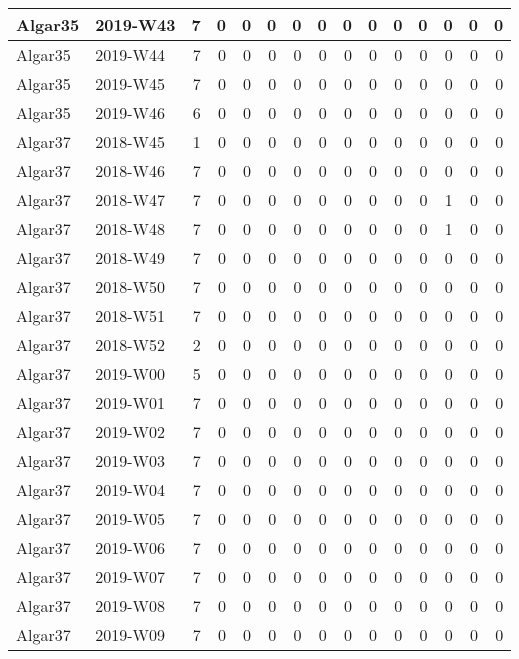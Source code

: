 \documentclass[]{book}
\begin{document}
\begin{table}
\begin{tabular}[t]{l|l|r|r|r|r|r|r|r|r|r|r|r|r|r}
\hline
Algar35 & 2019-W43 & 7 & 0 & 0 & 0 & 0 & 0 & 0 & 0 & 0 & 0 & 0 & 0 & 0\\
\hline
Algar35 & 2019-W44 & 7 & 0 & 0 & 0 & 0 & 0 & 0 & 0 & 0 & 0 & 0 & 0 & 0\\
\hline
Algar35 & 2019-W45 & 7 & 0 & 0 & 0 & 0 & 0 & 0 & 0 & 0 & 0 & 0 & 0 & 0\\
\hline
Algar35 & 2019-W46 & 6 & 0 & 0 & 0 & 0 & 0 & 0 & 0 & 0 & 0 & 0 & 0 & 0\\
\hline
Algar37 & 2018-W45 & 1 & 0 & 0 & 0 & 0 & 0 & 0 & 0 & 0 & 0 & 0 & 0 & 0\\
\hline
Algar37 & 2018-W46 & 7 & 0 & 0 & 0 & 0 & 0 & 0 & 0 & 0 & 0 & 0 & 0 & 0\\
\hline
Algar37 & 2018-W47 & 7 & 0 & 0 & 0 & 0 & 0 & 0 & 0 & 0 & 0 & 1 & 0 & 0\\
\hline
Algar37 & 2018-W48 & 7 & 0 & 0 & 0 & 0 & 0 & 0 & 0 & 0 & 0 & 1 & 0 & 0\\
\hline
Algar37 & 2018-W49 & 7 & 0 & 0 & 0 & 0 & 0 & 0 & 0 & 0 & 0 & 0 & 0 & 0\\
\hline
Algar37 & 2018-W50 & 7 & 0 & 0 & 0 & 0 & 0 & 0 & 0 & 0 & 0 & 0 & 0 & 0\\
\hline
Algar37 & 2018-W51 & 7 & 0 & 0 & 0 & 0 & 0 & 0 & 0 & 0 & 0 & 0 & 0 & 0\\
\hline
Algar37 & 2018-W52 & 2 & 0 & 0 & 0 & 0 & 0 & 0 & 0 & 0 & 0 & 0 & 0 & 0\\
\hline
Algar37 & 2019-W00 & 5 & 0 & 0 & 0 & 0 & 0 & 0 & 0 & 0 & 0 & 0 & 0 & 0\\
\hline
Algar37 & 2019-W01 & 7 & 0 & 0 & 0 & 0 & 0 & 0 & 0 & 0 & 0 & 0 & 0 & 0\\
\hline
Algar37 & 2019-W02 & 7 & 0 & 0 & 0 & 0 & 0 & 0 & 0 & 0 & 0 & 0 & 0 & 0\\
\hline
Algar37 & 2019-W03 & 7 & 0 & 0 & 0 & 0 & 0 & 0 & 0 & 0 & 0 & 0 & 0 & 0\\
\hline
Algar37 & 2019-W04 & 7 & 0 & 0 & 0 & 0 & 0 & 0 & 0 & 0 & 0 & 0 & 0 & 0\\
\hline
Algar37 & 2019-W05 & 7 & 0 & 0 & 0 & 0 & 0 & 0 & 0 & 0 & 0 & 0 & 0 & 0\\
\hline
Algar37 & 2019-W06 & 7 & 0 & 0 & 0 & 0 & 0 & 0 & 0 & 0 & 0 & 0 & 0 & 0\\
\hline
Algar37 & 2019-W07 & 7 & 0 & 0 & 0 & 0 & 0 & 0 & 0 & 0 & 0 & 0 & 0 & 0\\
\hline
Algar37 & 2019-W08 & 7 & 0 & 0 & 0 & 0 & 0 & 0 & 0 & 0 & 0 & 0 & 0 & 0\\
\hline
Algar37 & 2019-W09 & 7 & 0 & 0 & 0 & 0 & 0 & 0 & 0 & 0 & 0 & 0 & 0 & 0\\

\end{tabular}
\end{table}
\end{document}

